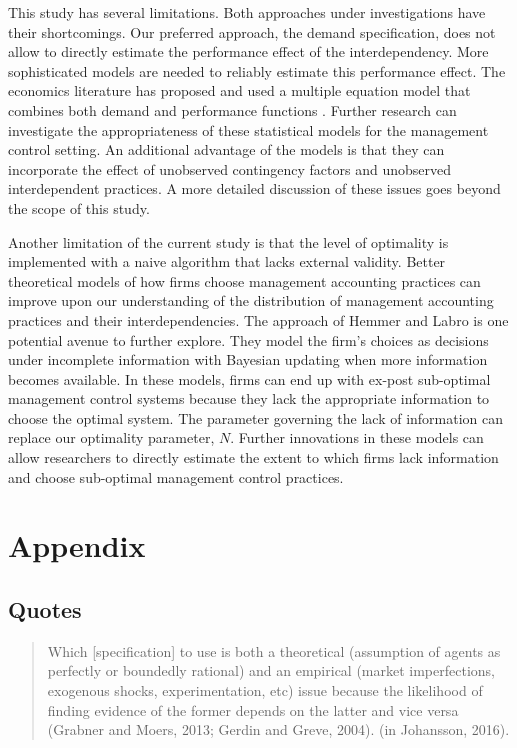 \documentclass[12pt]{article}
\begin{document}
This study has several limitations. Both approaches under investigations
have their shortcomings. Our preferred approach, the demand
specification, does not allow to directly estimate the performance
effect of the interdependency. More sophisticated models are needed to
reliably estimate this performance effect. The economics literature has
proposed and used a multiple equation model that combines both demand
and performance functions
\citep{Athey1998, Gentzkow2007, Kretschmer2012, Miravete2006}. Further
research can investigate the appropriateness of these statistical models
for the management control setting. An additional advantage of the
models is that they can incorporate the effect of unobserved contingency
factors and unobserved interdependent practices. A more detailed
discussion of these issues goes beyond the scope of this study.

Another limitation of the current study is that the level of optimality
is implemented with a naive algorithm that lacks external validity.
Better theoretical models of how firms choose management accounting
practices can improve upon our understanding of the distribution of
management accounting practices and their interdependencies. The
approach of Hemmer and Labro \citeyearpar{Hemmer2015} is one potential
avenue to further explore. They model the firm's choices as decisions
under incomplete information with Bayesian updating when more
information becomes available. In these models, firms can end up with
ex-post sub-optimal management control systems because they lack the
appropriate information to choose the optimal system. The parameter
governing the lack of information can replace our optimality parameter,
\(N\). Further innovations in these models can allow researchers to
directly estimate the extent to which firms lack information and choose
sub-optimal management control practices.

\pagebreak

\appendix
\renewcommand{\theequation}{A.\arabic{equation}}
\setcounter{equation}{0}

\section{Appendix}\label{appendix}

\subsection{Quotes}


\begin{quote}
Which {[}specification{]} to use is both a theoretical (assumption of agents as perfectly or boundedly rational) and an empirical (market imperfections, exogenous shocks, experimentation, etc) issue because the likelihood of finding evidence of the former depends on the latter and vice versa (Grabner and Moers, 2013; Gerdin and Greve, 2004). (in Johansson, 2016).
\end{quote}
\end{document}
